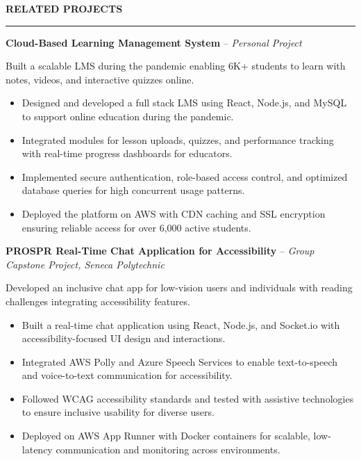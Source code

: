 \documentclass[10pt,letterpaper]{article}
\begin{document}
\vspace{6pt}

\textbf{RELATED PROJECTS}\\[-8pt]
\noindent\rule{\textwidth}{1pt}

\vspace{-2pt}

\textbf{Cloud-Based Learning Management System} -- \emph{Personal Project}

\vspace{-1pt}

Built a scalable LMS during the pandemic enabling 6K+ students to learn with notes, videos, and interactive quizzes online.
\vspace{-1pt}
\begin{itemize}
\item Designed and developed a full stack LMS using React, Node.js, and MySQL to support online education during the pandemic.
\item Integrated modules for lesson uploads, quizzes, and performance tracking with real-time progress dashboards for educators.
\item Implemented secure authentication, role-based access control, and optimized database queries for high concurrent usage patterns.
\item Deployed the platform on AWS with CDN caching and SSL encryption ensuring reliable access for over 6,000 active students.
\end{itemize}

\textbf{PROSPR  Real-Time Chat Application for Accessibility} -- \emph{Group Capstone Project, Seneca Polytechnic}

\vspace{-1pt}

Developed an inclusive chat app for low-vision users and individuals with reading challenges integrating accessibility features.
\vspace{-1pt}
\begin{itemize}
\item Built a real-time chat application using React, Node.js, and Socket.io with accessibility-focused UI design and interactions.
\item Integrated AWS Polly and Azure Speech Services to enable text-to-speech and voice-to-text communication for accessibility.
\item Followed WCAG accessibility standards and tested with assistive technologies to ensure inclusive usability for diverse users.
\item Deployed on AWS App Runner with Docker containers for scalable, low-latency communication and monitoring across environments.
\end{itemize}
\end{document}
